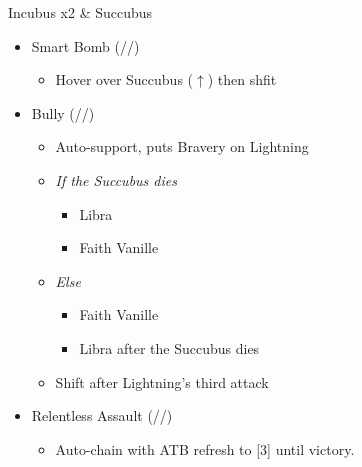\renewcommand{\first}{[1] Relentless Assault (\rav/\com/\rav)}
\renewcommand{\second}{[2] Bully (\syn/\com/\sab)}
\renewcommand{\third}{[3] Relentless Assault (\rav/\com/\rav)}
\renewcommand{\fourth}{[4] Smart Bomb (\rav/\rav/\sab)}
\renewcommand{\fifth}{[5] Tri-Disaster (\rav/\rav/\rav)}
\renewcommand{\sixth}{[6] Malevolence (\syn/\rav/\rav)}

\begin{battle}{Incubus x2 \& Succubus}
\begin{itemize}
    \item \fourth
    \begin{itemize}
        \item Hover over Succubus ($\uparrow$) then shfit
    \end{itemize}
    \item \second
    \begin{itemize}
        \item Auto-support, puts Bravery on Lightning
        \item \textit{If the Succubus dies}
        \begin{itemize}
            \item Libra
            \item Faith Vanille
        \end{itemize}
        \item \textit{Else}
        \begin{itemize}
            \item Faith Vanille
            \item Libra after the Succubus dies
        \end{itemize}
        \item Shift after Lightning's third attack
    \end{itemize}
    \item \first
    \begin{itemize}
        \item Auto-chain with ATB refresh to [3] until victory.
    \end{itemize}
\end{itemize}
 
\end{battle}


